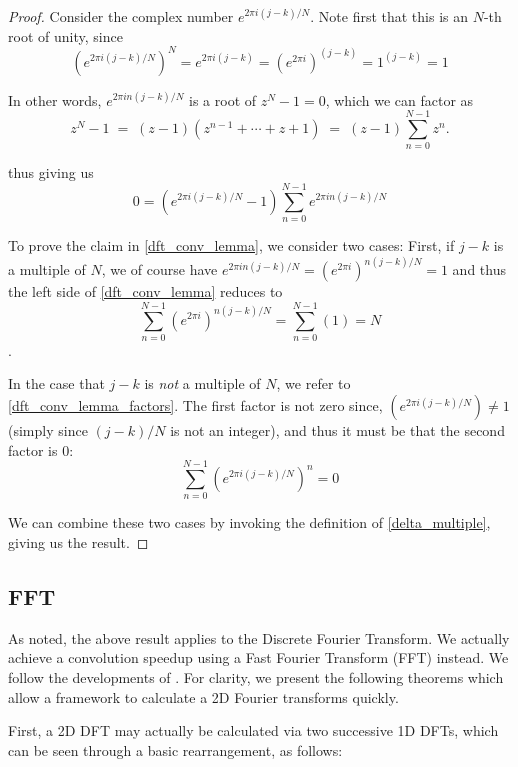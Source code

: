 \begin{proof}

Consider the complex number $e^{2\pi i (j-k)/N}$. Note first that this is an $N$-th root of unity, since
\[
\left(e^{2\pi i (j-k)/N}\right)^N = e^{2\pi i (j-k)} = \left(e^{2\pi i}\right)^{(j-k)}
= 1^{(j-k)} = 1
\]

In other words, $e^{2\pi i n(j-k)/N}$ is a root of $z^N -1 = 0$, which we can factor as
\begin{equation}
z^N -1 \;=\; (z-1)\left(z^{n-1} + \cdots + z + 1\right) \;=\; (z-1)\sum_{n=0}^{N-1} z^n .
\end{equation}

thus giving us
\begin{equation} \label{dft_conv_lemma_factors}
0 = \left(e^{2\pi i(j-k)/N} - 1\right) \sum_{n=0}^{N-1} e^{2\pi i n(j-k)/N}
\end{equation}

To prove the claim in \cref{dft_conv_lemma}, we consider two cases: First, if $j-k$ is a multiple of $N$, we of course have $e^{2\pi i n(j-k)/N} = \left(e^{2\pi i}\right)^{n(j-k)/N} = 1$  and thus the left side of \cref{dft_conv_lemma} reduces to 
\[
\sum_{n=0}^{N-1} \left(e^{2\pi i}\right)^{n(j-k)/N} = \sum_{n=0}^{N-1} \left(1\right) = N
\].

In the case that $j-k$ is \textit{not} a multiple of $N$, we refer to \cref{dft_conv_lemma_factors}.
The first factor is not zero since, $\left(e^{2\pi i (j-k)/N}\right) \ne 1$ (simply since $(j-k)/N$ is not an integer), and thus it must be that the second factor is 0:
\[
\sum_{n=0}^{N-1} \left(e^{2\pi i (j-k)/N}\right)^n = 0\]

We can combine these two cases by invoking the definition of \cref{delta_multiple}, giving us the result.
\end{proof}
		
\subsection{FFT}
As noted, the above result applies to the Discrete Fourier Transform. We actually achieve a convolution speedup using a Fast Fourier Transform (FFT) instead. We follow the developments of \cite{DIPGW}.
For clarity, we present the following theorems which allow a framework to calculate a 2D Fourier transforms quickly.


First, a 2D DFT may actually be calculated via two successive 1D DFTs, which can be
seen through a basic rearrangement, as follows:

